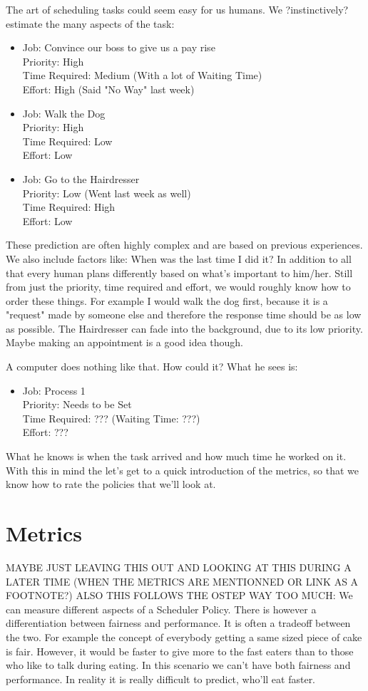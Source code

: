 \documentclass{report}
\begin{document}
The art of scheduling tasks could seem easy for us humans.
We ?instinctively? estimate the many aspects of the task:
\begin{itemize}
\item Job: Convince our boss to give us a pay rise\\Priority: High\\Time Required: Medium (With a lot of Waiting Time)\\Effort: High (Said "No Way" last week)
\item Job: Walk the Dog\\Priority: High\\Time Required: Low\\Effort: Low
\item Job: Go to the Hairdresser\\ Priority: Low (Went last week as well)\\Time Required: High\\Effort: Low
\end{itemize}
These prediction are often highly complex and are based on previous experiences.
We also include factors like: When was the last time I did it?
In addition to all that every human plans differently based on what's important to him/her.
Still from just the priority, time required and effort, we would roughly know how to order these things.
For example I would walk the dog first, because it is a "request" made by someone else and therefore the response time should be as low as possible.
The Hairdresser can fade into the background, due to its low priority. Maybe making an appointment is a good idea though.

A computer does nothing like that. How could it? What he sees is:
\begin{itemize}
\item Job: Process 1\\Priority: Needs to be Set\\Time Required: ??? (Waiting Time: ???)\\Effort: ???
\end{itemize}
What he knows is when the task arrived and how much time he worked on it.
With this in mind the let's get to a quick introduction of the metrics, so that we know how to rate the policies that we'll look at.



\chapter*{Metrics}
MAYBE JUST LEAVING THIS OUT AND LOOKING AT THIS DURING A LATER TIME (WHEN THE METRICS ARE MENTIONNED OR LINK AS A FOOTNOTE?)
ALSO THIS FOLLOWS THE OSTEP WAY TOO MUCH:
We can measure different aspects of a Scheduler Policy. There is however a differentiation between fairness and performance. It is often a tradeoff between the two. For example the concept of everybody getting a same sized piece of cake is fair. However, it would be faster to give more to the fast eaters than to those who like to talk during eating. In this scenario we can't have both fairness and performance. In reality it is really difficult to predict, who'll eat faster.
\end{document}
